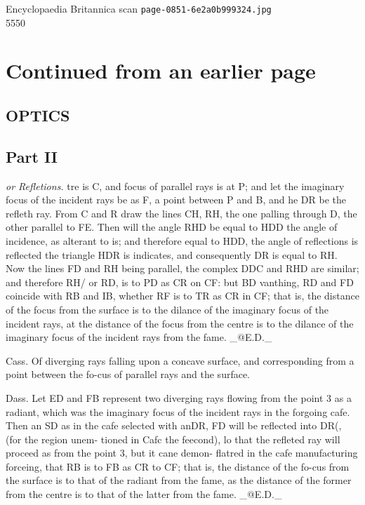 \documentclass{article}
\begin{document}
\begin{center}
{\Large Encyclopaedia Britannica scan \texttt{page-0851-6e2a0b999324.jpg}}\\[0.5em]
5550
\end{center}
\section*{Continued from an earlier page}
\subsection*{OPTICS}
\subsection*{Part II}
\textit{or Refletions.}
tre is C, and focus of parallel rays is at P; and let the imaginary focus of the incident rays be as F, a point between P and B, and he DR be the refleth ray. From C and R draw the lines CH, RH, the one palling through D, the other parallel to FE. Then will the angle RHD be equal to HDD the angle of incidence, as alterant to is; and therefore equal to HDD, the angle of reflections is reflected the triangle HDR is indicates, and consequently DR is equal to RH. Now the lines FD and RH being parallel, the complex DDC and RHD are similar; and therefore RH/ or RD, is to PD as CR on CF: but BD vanthing, RD and FD coincide with RB and IB, whether RF is to TR as CR in CF; that is, the distance of the focus from the surface is to the dilance of the imaginary focus of the incident rays, at the distance of the focus from the centre is to the dilance of the imaginary focus of the incident rays from the fame. \_@E.D.\_

Cass. Of diverging rays falling upon a concave surface, and corresponding from a point between the fo-cus of parallel rays and the surface.

Dass. Let ED and FB represent two diverging rays flowing from the point 3 as a radiant, which was the imaginary focus of the incident rays in the forgoing cafe. Then an SD as in the cafe selected with anDR, FD will be reflected into DR(, (for the region unem- tioned in Cafc the feecond), lo that the refleted ray will proceed as from the point 3, but it cane demon- flatred in the cafe manufacturing forceing, that RB is to FB as CR to CF; that is, the distance of the fo-cus from the surface is to that of the radiant from the fame, as the distance of the former from the centre is to that of the latter from the fame. \_@E.D.\_
\end{document}
